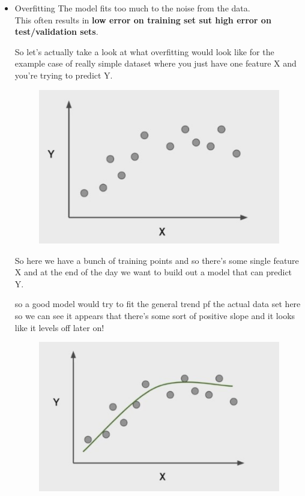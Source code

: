 \documentclass[12pt]{article}
\begin{document}
\begin{itemize}
	\item
	Overfitting 
	The model fits too much to the noise from the data.\\
	This often results in \textbf{low error on training set sut high error on test/validation sets}.
	
	So let's actually take a look at what overfitting would look like for the example case of really simple dataset where you just have one feature X and you're trying to predict Y. 
	\begin{figure}[htbp]
	\centerline{\includegraphics[scale=.5]{img/overfitting1.jpg}}
\end{figure}
	So here we have a bunch of training points and so there's some single feature X and at the end of the day we want to build out a model that can predict Y.
	
	 so a good model would try to fit the general trend pf the actual data set here so we can see it appears that there's some sort of positive slope and it looks like it levels off later on!
\begin{figure}[htbp]
\centerline{\includegraphics[scale=.5]{img/overfittingGoodModel.jpg}}
\end{figure}
 

\end{itemize}
\end{document}
